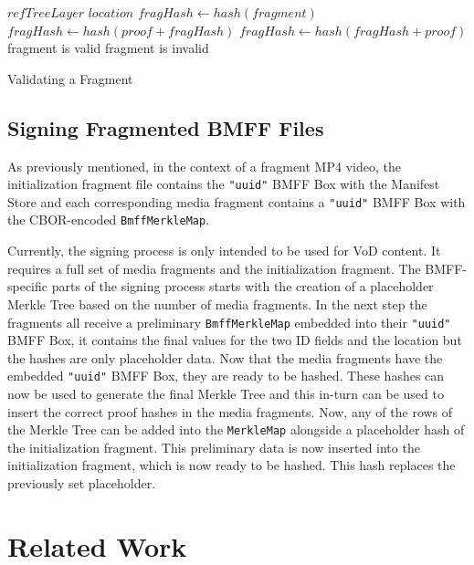 \begin{algorithm}[H]
    \begin{algorithmic}[1]
        \Require $refTreeLayer$ 
        \Require $location$ 
        \State $fragHash \gets hash(fragment)$
                \State $fragHash \gets hash(proof + fragHash)$
            \Else
                \State $fragHash \gets hash(fragHash + proof)$
            \EndIf
        \EndFor
            \State fragment is valid
        \Else
            \State fragment is invalid
        \EndIf
    \end{algorithmic}
    \caption{Validating a Fragment}
    \label{alg:validate}
\end{algorithm}

\subsection{Signing Fragmented BMFF Files\label{sec:sign_bmff}}

As previously mentioned, in the context of a fragment MP4 video, the initialization fragment file contains the \texttt{"uuid"} BMFF Box with the Manifest Store and each corresponding media fragment contains a \texttt{"uuid"} BMFF Box with the CBOR-encoded \texttt{BmffMerkleMap}.

Currently, the signing process is only intended to be used for VoD content. It requires a full set of media fragments and the initialization fragment. The BMFF-specific parts of the signing process starts with the creation of a placeholder Merkle Tree based on the number of media fragments. In the next step the fragments all receive a preliminary \texttt{BmffMerkleMap} embedded into their \texttt{"uuid"} BMFF Box, it contains the final values for the two ID fields and the location but the hashes are only placeholder data. Now that the media fragments have the embedded \texttt{"uuid"} BMFF Box, they are ready to be hashed. These hashes can now be used to generate the final Merkle Tree and this in-turn can be used to insert the correct proof hashes in the media fragments. Now, any of the rows of the Merkle Tree can be added into the \texttt{MerkleMap} alongside a placeholder hash of the initialization fragment. This preliminary data is now inserted into the initialization fragment, which is now ready to be hashed. This hash replaces the previously set placeholder.

\section{Related Work}

